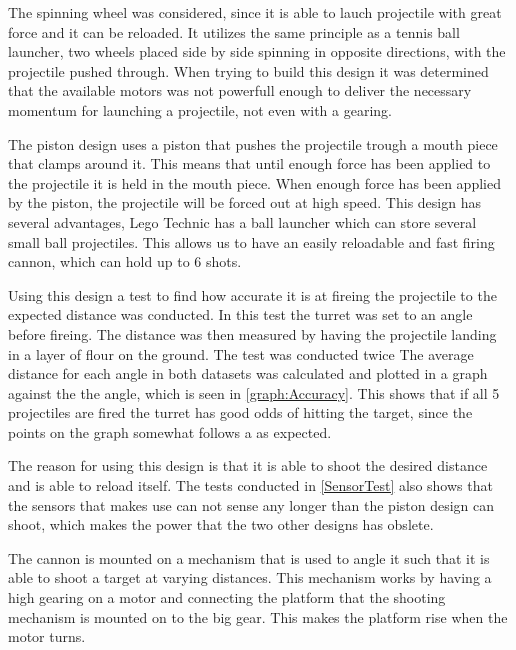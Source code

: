 The spinning wheel was considered, since it is able to lauch projectile with
great force and it can be reloaded. It utilizes the same principle as a tennis
ball launcher, two wheels placed side by side spinning in opposite directions, with the projectile pushed through.
When trying to build this design it was determined that the available motors was
not powerfull enough to deliver the necessary momentum for launching a
projectile, not even with a gearing.\nl

The piston design uses a piston that pushes the projectile
trough a mouth piece that clamps around it. This means that until enough force
has been applied to the projectile it is held in the mouth piece. When enough
force has been applied by the piston, the projectile will be forced out at high
speed.
This design has several advantages, Lego Technic has a ball launcher which can
store several small ball projectiles. This allows us to have an easily
reloadable and fast firing cannon, which can hold up to 6 shots.\nl

Using this design a test to find how accurate it is at fireing the projectile
to the expected distance was conducted.
In this test the turret was set to an angle before fireing. The distance was
then measured by having the projectile landing in a layer of flour on the
ground. The test was conducted twice The average distance for each angle in
both datasets was calculated and plotted in a graph against the the angle,
which is seen in \autoref{graph:Accuracy}. This shows that if all 5 projectiles
are fired the turret has good odds of hitting the target, since the points on
the graph somewhat follows a  as
expected.


The reason for using this design is that it is able to shoot the desired
distance and is able to reload itself. The tests conducted in
\autoref{SensorTest} also shows that the sensors that \name makes use can not
sense any longer than the piston design can shoot, which makes the power that
the two other designs has obslete.\nl

The cannon is mounted on a mechanism that is used to angle it such that it
is able to shoot a target at varying distances. This mechanism works by having a
high gearing on a motor and connecting the platform that the shooting mechanism
is mounted on to the big gear. This makes the platform rise when the motor
turns.

